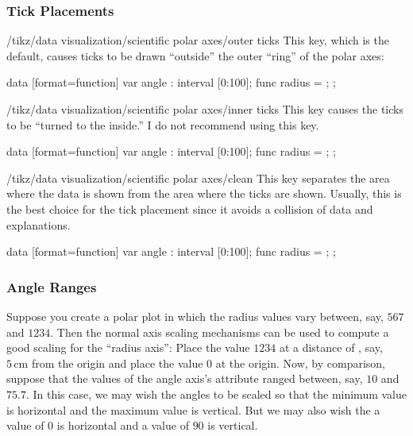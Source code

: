 \subsubsection{Tick Placements}

\begin{key}{/tikz/data visualization/scientific polar axes/outer ticks}
  This key, which is the default, causes ticks to be drawn
  ``outside'' the outer ``ring'' of the polar axes:
\begin{codeexample}[width=8.8cm]
\tikz \datavisualization [
  scientific polar axes={outer ticks, 0 to 180},
  visualize as smooth line]
data [format=function] {
  var  angle : interval [0:100];
  func radius = \value{angle};
};
\end{codeexample}
\end{key}

\begin{key}{/tikz/data visualization/scientific polar axes/inner ticks}
  This key causes the ticks to be ``turned to the inside.'' I do not
  recommend using this key.
\begin{codeexample}[width=8.8cm]
\tikz \datavisualization [
  scientific polar axes={inner ticks, 0 to 180},
  visualize as smooth line]
data [format=function] {
  var  angle : interval [0:100];
  func radius = \value{angle};
};
\end{codeexample}
\end{key}

\begin{key}{/tikz/data visualization/scientific polar axes/clean}
  This key separates the area where the data is shown from the area
  where the ticks are shown. Usually, this is the best choice for the
  tick placement since it avoids a collision of data and
  explanations. 
\begin{codeexample}[width=8.8cm]
\tikz \datavisualization [
  scientific polar axes={clean, 0 to 180},
  visualize as smooth line]
data [format=function] {
  var  angle : interval [0:100];
  func radius = \value{angle};
};
\end{codeexample}  
\end{key}


\subsubsection{Angle Ranges}
\label{section-dv-angle-ranges}

Suppose you create a polar plot in which the radius values vary
between, say, $567$ and $1234$. Then the normal axis scaling mechanisms 
can be used to compute a good scaling for the ``radius axis'': Place
the value $1234$ at a distance of , say, $5\,\mathrm{cm}$ from the
origin and place the value $0$ at the origin. Now, by comparison,
suppose that the values of the angle axis's attribute ranged between,
say, $10$ and $75.7$. In this case, we may wish the angles to be
scaled so that the minimum value is horizontal and the maximum value is
vertical. But we may also wish the a value of $0$ is horizontal and a
value of $90$ is vertical. 


